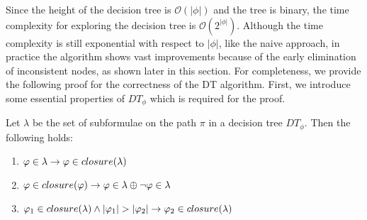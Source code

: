 Since the height of the decision tree is $\mathcal{O}(|\phi|)$ and the tree is binary, the time complexity for exploring the decision tree is $\mathcal{O}(2^{|\phi|})$. Although the time complexity is still exponential with respect to $|\phi|$, like the naive approach, in practice the algorithm shows vast improvements because of the early elimination of inconsistent nodes, as shown later in this section. For completeness, we provide the following proof for the correctness of the DT algorithm. First, we introduce some essential properties of $DT_\phi$ which is required for the proof.

\begin{definition}
\label{def:dt-props}
Let $\lambda$ be the set of subformulae on the path $\pi$ in a decision tree $DT_\phi$. Then the following holds:
\begin{enumerate}[label=(\alph*)]
    \item \label{def:dt-prop1} $\varphi \in \lambda \rightarrow \varphi \in closure(\lambda)$
    \item \label{def:dt-prop2} $\varphi \in closure(\varphi) \rightarrow \varphi \in \lambda \oplus \lnot \varphi \in \lambda$
    \item \label{def:dt-prop3} $\varphi_1 \in closure(\lambda) \land |\varphi_1| > |\varphi_2| \rightarrow \varphi_2 \in closure(\lambda)$
\end{enumerate}
\end{definition}

